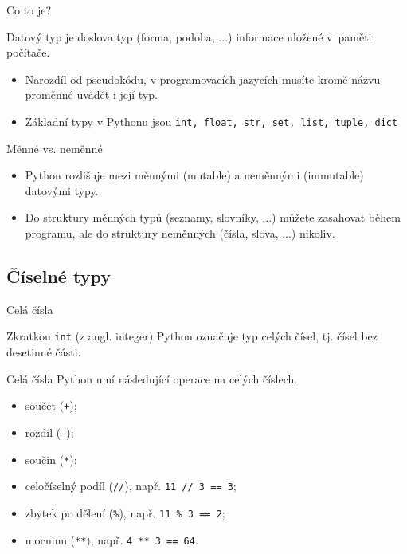 \documentclass[aspectratio=169,11pt]{beamer}
\begin{document}
\begin{frame}[plain]
 \sectionpage
\end{frame}

\begin{frame}{Co to je?}
 \begin{tcolorbox}[title=Datový typ]
  \alert{Datový typ} je doslova typ (forma, podoba, ...) informace uložené
  v~paměti počítače.
 \end{tcolorbox}
 \pause
 \begin{itemize}
  \item<2-> Narozdíl od pseudokódu, v programovacích jazycích musíte kromě názvu
   proměnné uvádět i její typ.
  \item<3-> Základní typy v Pythonu jsou \texttt{int, float, str, set, list,
   tuple, dict}
 \end{itemize}
\end{frame}

\begin{frame}{Měnné vs. neměnné}
 \begin{itemize}
  \item<1-> Python rozlišuje mezi \alert{měnnými} (mutable) a \alert{neměnnými}
   (immutable) datovými typy.
  \item<2-> Do struktury měnných typů (seznamy, slovníky, ...) můžete zasahovat
   během programu, ale do struktury neměnných (čísla, slova, ...) nikoliv.
 \end{itemize}
\end{frame}

\subsection[Číselné typy]{Číselné typy}

\begin{frame}{Celá čísla}
 \begin{tcolorbox}[title=Datový typ \texttt{int}]
  Zkratkou \alert{\texttt{int}} (z angl. \alert{int}eger) Python označuje typ
  celých čísel, tj. čísel bez desetinné části.
 \end{tcolorbox}
\end{frame}

\begin{frame}{Celá čísla}
 Python umí následující operace na celých číslech.
 \begin{itemize}
  \item součet (\texttt{+});
  \item rozdíl (\texttt{-});
  \item součin (\texttt{*});
  \pause
  \item<2-> celočíselný podíl (\texttt{//}), např. \texttt{11 // 3 == 3};
  \item<3-> zbytek po dělení (\texttt{\%}), např. \texttt{11 \% 3 == 2};
  \item<4-> mocninu (\texttt{**}), např. \texttt{4 ** 3 == 64}.
 \end{itemize}
\end{frame}
\end{document}
